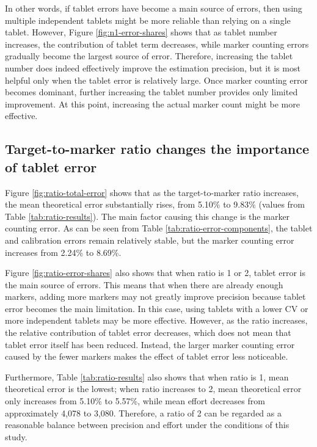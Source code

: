 \documentclass[
  12pt,
]{article}
\begin{document}
In other words, if tablet errors have become a main source of errors,
then using multiple independent tablets might be more reliable than
relying on a single tablet. However, Figure \ref{fig:n1-error-shares}
shows that as tablet number increases, the contribution of tablet term
decreases, while marker counting errors gradually become the largest
source of error. Therefore, increasing the tablet number does indeed
effectively improve the estimation precision, but it is most helpful
only when the tablet error is relatively large. Once marker counting
error becomes dominant, further increasing the tablet number provides
only limited improvement. At this point, increasing the actual marker
count might be more effective.

\subsection{Target-to-marker ratio changes the importance of tablet
error}\label{target-to-marker-ratio-changes-the-importance-of-tablet-error}

Figure \ref{fig:ratio-total-error} shows that as the target-to-marker
ratio increases, the mean theoretical error substantially rises, from
5.10\% to 9.83\% (values from Table \ref{tab:ratio-results}). The main
factor causing this change is the marker counting error. As can be seen
from Table \ref{tab:ratio-error-components}, the tablet and calibration
errors remain relatively stable, but the marker counting error increases
from 2.24\% to 8.69\%.

Figure \ref{fig:ratio-error-shares} also shows that when ratio is 1 or
2, tablet error is the main source of errors. This means that when there
are already enough markers, adding more markers may not greatly improve
precision because tablet error becomes the main limitation. In this
case, using tablets with a lower CV or more independent tablets may be
more effective. However, as the ratio increases, the relative
contribution of tablet error decreases, which does not mean that tablet
error itself has been reduced. Instead, the larger marker counting error
caused by the fewer markers makes the effect of tablet error less
noticeable.

Furthermore, Table \ref{tab:ratio-results} also shows that when ratio is
1, mean theoretical error is the lowest; when ratio increases to 2, mean
theoretical error only increases from 5.10\% to 5.57\%, while mean
effort decreases from approximately 4,078 to 3,080. Therefore, a ratio
of 2 can be regarded as a reasonable balance between precision and
effort under the conditions of this study.
\end{document}
